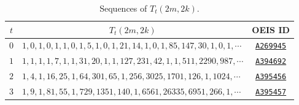 \begin{table}[H]
  \centering
  \begin{tabular}{|c|l |c|}
    \hline
    \multicolumn{1}{|c|}{$t$} &
    \multicolumn{1}{c|}{$T_t(2m,2k)$} &
    \multicolumn{1}{c|}{OEIS ID} \\
    \hline

    $0$ &
    $1, 0, 1, 0, 1, 1, 0, 1, 5, 1, 0, 1, 21, 14, 1, 0, 1, 85, 147, 30, 1, 0, 1, \cdots $
    & \href{https://oeis.org/A269945}{\texttt{A269945}} \\

    $1$ &
    $1, 1, 1, 1, 7, 1, 1, 31, 20, 1, 1, 127, 231, 42, 1, 1, 511, 2290, 987,\cdots$
    & \href{https://oeis.org/A394692}{\texttt{A394692}} \\

    $2$ &
    $1, 4, 1, 16, 25, 1, 64, 301, 65, 1, 256, 3025, 1701, 126, 1, 1024, \cdots$
    & \href{https://oeis.org/A395456}{\texttt{A395456}} \\

    $3$ &
    $1, 9, 1, 81, 55, 1, 729, 1351, 140, 1, 6561, 26335, 6951, 266, 1, \cdots$
    & \href{https://oeis.org/A395457}{\texttt{A395457}} \\

    \hline
  \end{tabular}
  \caption{Sequences of $T_t(2m,2k)$.}
  \label{tab:central-factorial-numbers-even}
\end{table}
